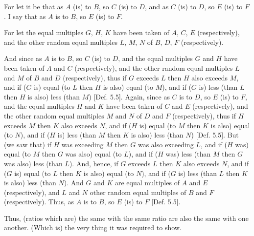 \begin{Parallel}{}{}
{\epsfysize=0.75in
\centerline{}

For let it be that as $A$ (is) to $B$, so $C$ (is) to $D$, and as $C$ (is) to $D$, so $E$ (is) to $F$. I say
that as  $A$ is to $B$, so $E$ (is) to $F$.

For let the equal multiples $G$, $H$,  $K$ have been taken of $A$, $C$,  $E$ (respectively), and
the other random equal multiples $L$, $M$,  $N$ of $B$, $D$, $F$ (respectively).

And since as $A$ is to $B$, so $C$ (is) to $D$, and the equal multiples $G$ and $H$
have been taken of $A$ and $C$ (respectively), and the other random equal
multiples $L$ and $M$ of $B$ and $D$ (respectively),  thus if $G$ exceeds $L$ then
$H$ also exceeds $M$, and if ($G$ is) equal (to $L$ then $H$ is also)
equal (to $M$), and if ($G$ is) less (than $L$ then $H$ is also) less (than $M$)  [Def. 5.5]. Again, since as $C$ is to $D$, so $E$
(is) to $F$, and the equal multiples $H$ and $K$ have been taken of $C$ and $E$
(respectively), and the other random equal multiples $M$ and $N$ of
$D$ and $F$ (respectively), thus if $H$ exceeds $M$ then
$K$ also exceeds $N$, and if ($H$ is) equal  (to $M$ then $K$ is also)
equal (to $N$), and if ($H$ is) less (than $M$  then $K$ is also) less (than $N$) [Def. 5.5]. But (we saw that) if $H$ was exceeding $M$ then $G$ was also
exceeding $L$, and if ($H$ was) equal (to $M$ then $G$ was also)
equal (to $L$), and if ($H$ was) less (than $M$ then $G$ was also) less (than $L$).
And, hence, if $G$ exceeds $L$ then
$K$ also exceeds $N$, and if ($G$ is) equal (to $L$ then $K$ is also)  equal (to $N$), and if ($G$ is) less (than $L$ then $K$ is also) less (than $N$). And $G$ and $K$ are equal multiples of $A$ and $E$ (respectively), and $L$ and $N$
other random equal multiples of $B$ and $F$ (respectively). Thus, as $A$ is to $B$,
so $E$ (is) to $F$ [Def. 5.5].

Thus, (ratios which are) the same with the same ratio  are also the same with one another. (Which is) the very thing it was required to show.}
\end{Parallel}


\vspace{7pt}{\footnotesize \noindent$^\dag$ In modern notation, this proposition
reads that if $\alpha:\beta::\gamma:\delta$ and $\gamma:\delta::\epsilon:\zeta$ then $\alpha:\beta::\epsilon:\zeta$.}

